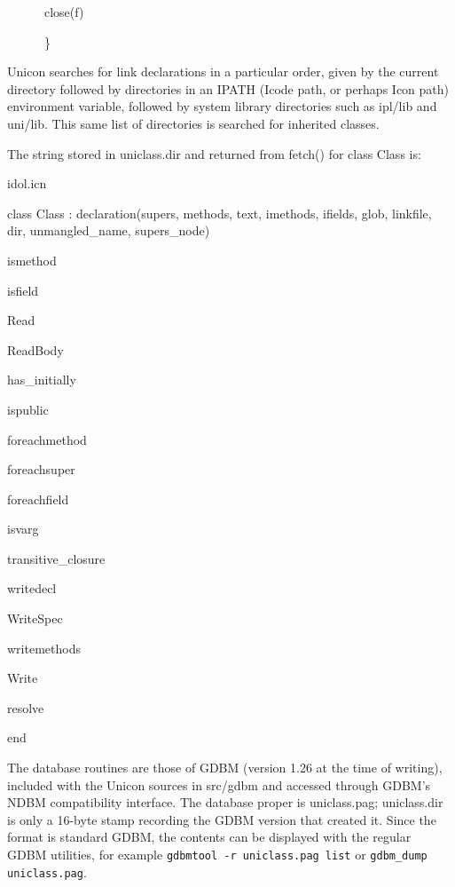 {\ttfamily\mdseries
\ \ \ \ \ \ close(f)}

{\ttfamily\mdseries
\ \ \ \ \ \ \}}


Unicon searches for {\textquotedbl}link{\textquotedbl} declarations in
a particular order, given by the current directory followed by
directories in an IPATH (Icode path, or perhaps Icon path) environment
variable, followed by system library directories such as ipl/lib and
uni/lib. This same list of directories is searched for inherited
classes.


The string stored in uniclass.dir and returned from fetch() for class Class is: 

{\ttfamily\mdseries
idol.icn}

{\ttfamily\mdseries
class Class : declaration(supers, methods, text, imethods, ifields, glob, linkfile, dir, unmangled\_name, supers\_node)}

{\ttfamily\mdseries
ismethod}

{\ttfamily\mdseries
isfield}

{\ttfamily\mdseries
Read}

{\ttfamily\mdseries
ReadBody}

{\ttfamily\mdseries
has\_initially}

{\ttfamily\mdseries
ispublic}

{\ttfamily\mdseries
foreachmethod}

{\ttfamily\mdseries
foreachsuper}

{\ttfamily\mdseries
foreachfield}

{\ttfamily\mdseries
isvarg}

{\ttfamily\mdseries
transitive\_closure}

{\ttfamily\mdseries
writedecl}

{\ttfamily\mdseries
WriteSpec}

{\ttfamily\mdseries
writemethods}

{\ttfamily\mdseries
Write}

{\ttfamily\mdseries
resolve}

{\ttfamily\mdseries
end}

\goodbreak
The database routines are those of GDBM (version 1.26 at the time of
writing), included with the Unicon sources in src/gdbm and accessed
through GDBM's NDBM compatibility interface. The database proper is
uniclass.pag; uniclass.dir is only a 16-byte stamp recording the GDBM
version that created it. Since the format is standard GDBM, the
contents can be displayed with the regular GDBM utilities, for example
{\tt gdbmtool -r uniclass.pag list} or {\tt gdbm\_dump uniclass.pag}.

